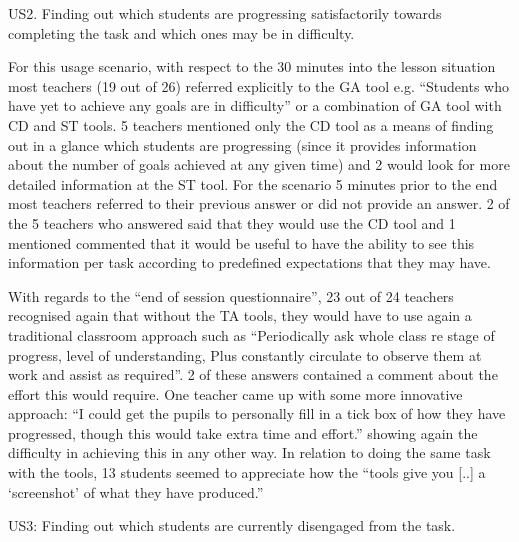 US2. Finding out which students are progressing satisfactorily towards completing the task and which ones may be in difficulty.
 
For this usage scenario, with respect to the 30 minutes into the lesson situation most teachers (19 out of 26) referred explicitly to the GA tool e.g. “Students who have yet to achieve any goals are in difficulty” or a combination of GA tool with CD and ST tools. 5 teachers mentioned only the CD tool as a means of finding out in a glance which students are progressing (since it provides information about the number of goals achieved at any given time) and 2 would look for more detailed information at the ST tool. For the scenario 5 minutes prior to the end most teachers referred to their previous answer or did not provide an answer. 2 of the 5 teachers who answered said that they would use the CD tool and 1 mentioned commented that it would be useful to have the ability to see this information per task according to predefined expectations that they may have.
 
With regards to the “end of session questionnaire”, 23 out of 24
teachers recognised again that without the TA tools, they would have
to use again a traditional classroom approach such as “Periodically
ask whole class re stage of progress, level of understanding, Plus
constantly circulate to observe them at work and assist as
required”. 2 of these answers contained a comment about the effort
this would require. One teacher came up with some more innovative
approach: “I could get the pupils to personally fill in a tick box of
how they have progressed, though this would take extra time and
effort.” showing again the difficulty in achieving this in any other
way. In relation to doing the same task with the tools, 13 students
seemed to appreciate how the “tools give you [..] a ‘screenshot’ of
what they have produced.”

US3: Finding out which students are currently disengaged from the task.

